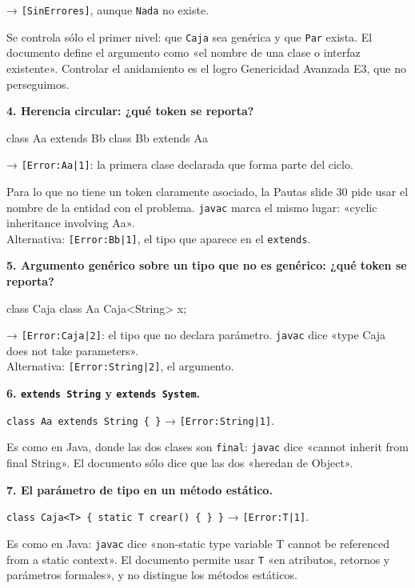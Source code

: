 \documentclass[12pt,a4paper]{article}
\newcommand{\cod}[1]{\texttt{#1}}
\newcommand{\pregunta}[1]{\par\medskip\needspace{4\baselineskip}\noindent\textbf{#1}\par\smallskip}
\begin{document}
→ \cod{[SinErrores]}, aunque \cod{Nada} no existe.

Se controla sólo el primer nivel: que \cod{Caja} sea genérica y que \cod{Par} exista. El documento
define el argumento como «el nombre de una clase o interfaz existente». Controlar el anidamiento es
el logro Genericidad Avanzada E3, que no perseguimos.

\pregunta{4. Herencia circular: ¿qué token se reporta?}

\begin{fuente}
class Aa extends Bb { }
class Bb extends Aa { }
\end{fuente}

→ \cod{[Error:Aa|1]}: la primera clase declarada que forma parte del ciclo.

Para lo que no tiene un token claramente asociado, la Pautas slide 30 pide usar el nombre de la
entidad con el problema. \cod{javac} marca el mismo lugar: «cyclic inheritance involving Aa».\\
Alternativa: \cod{[Error:Bb|1]}, el tipo que aparece en el \cod{extends}.

\pregunta{5. Argumento genérico sobre un tipo que no es genérico: ¿qué token se reporta?}

\begin{fuente}
class Caja { }
class Aa { Caja<String> x; }
\end{fuente}

→ \cod{[Error:Caja|2]}: el tipo que no declara parámetro. \cod{javac} dice «type Caja does not take
parameters».\\
Alternativa: \cod{[Error:String|2]}, el argumento.

\pregunta{6. \cod{extends String} y \cod{extends System}.}

\cod{class Aa extends String \{ \}} → \cod{[Error:String|1]}.

Es como en Java, donde las dos clases son \cod{final}: \cod{javac} dice «cannot inherit from final
String». El documento sólo dice que las dos «heredan de Object».

\pregunta{7. El parámetro de tipo en un método estático.}

\cod{class Caja<T> \{ static T crear() \{ \} \}} → \cod{[Error:T|1]}.

Es como en Java: \cod{javac} dice «non-static type variable T cannot be referenced from a static
context». El documento permite usar \cod{T} «en atributos, retornos y parámetros formales», y no
distingue los métodos estáticos.
\end{document}
